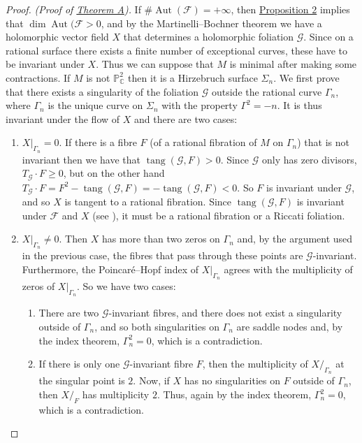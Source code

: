 \documentclass[british]{article}
\providecommand{\tightlist}{%
\setlength{\itemsep}{0pt}\setlength{\parskip}{0pt}}
\begin{document}
\begin{proof}
\emph{(Proof of \hyperref[theorem-A]{Theorem A}).} If
\(\#\operatorname{Aut}({\mathcal{F}})=+\infty\), then
\hyperref[proposition-2]{Proposition 2} implies that
\(\dim\operatorname{Aut}({\mathcal{F}}>0\), and by the
Martinelli--Bochner theorem we have a holomorphic vector field \(X\)
that determines a holomorphic foliation \({\mathcal{G}}\). Since on a
rational surface there exists a finite number of exceptional curves,
these have to be invariant under \(X\). Thus we can suppose that \(M\)
is minimal after making some contractions. If \(M\) is not
\(\mathbb{P}_\mathbb{C}^2\) then it is a Hirzebruch surface
\(\Sigma_n\). We first prove that there exists a singularity of the
foliation \({\mathcal{G}}\) outside the rational curve \(\Gamma_n\),
where \(\Gamma_n\) is the unique curve on \(\Sigma_n\) with the property
\(\Gamma^2=-n\). It is thus invariant under the flow of \(X\) and there
are two cases:

\begin{enumerate}
\def\labelenumi{\arabic{enumi}.}
\item
  \(X|_{\Gamma_n}=0\). If there is a fibre \(F\) (of a rational
  fibration of \(M\) on \(\Gamma_n\)) that is not invariant then we have
  that \(\operatorname{tang}({\mathcal{G}},F)>0\). Since
  \({\mathcal{G}}\) only has zero divisors,
  \(T_{\mathcal{G}}\cdot F\geqslant 0\), but on the other hand
  \(T_{\mathcal{G}}\cdot F=F^2-\operatorname{tang}({\mathcal{G}},F)=-\operatorname{tang}({\mathcal{G}},F)<0\).
  So \(F\) is invariant under \({\mathcal{G}}\), and so \(X\) is tangent
  to a rational fibration. Since
  \(\operatorname{tang}({\mathcal{G}},F)\) is invariant under
  \({\mathcal{F}}\) and \(X\) (see \autocite{6}), it must be a rational
  fibration or a Riccati foliation.
\item
  \(X|_{\Gamma_n}\neq0\). Then \(X\) has more than two zeros on
  \(\Gamma_n\) and, by the argument used in the previous case, the
  fibres that pass through these points are \({\mathcal{G}}\)-invariant.
  Furthermore, the Poincaré--Hopf index of \(X|_{\Gamma_n}\) agrees with
  the multiplicity of zeros of \(X|_{\Gamma_n}\). So we have two cases:

  \begin{enumerate}
  \def\labelenumii{\alph{enumii}.}
  \tightlist
  \item
    There are two \({\mathcal{G}}\)-invariant fibres, and there does not
    exist a singularity outside of \(\Gamma_n\), and so both
    singularities on \(\Gamma_n\) are saddle nodes and, by the index
    theorem, \(\Gamma_n^2=0\), which is a contradiction.
  \item
    If there is only one \({\mathcal{G}}\)-invariant fibre \(F\), then
    the multiplicity of \(X/_{\Gamma_n}\) at the singular point is
    \(2\). Now, if \(X\) has no singularities on \(F\) outside of
    \(\Gamma_n\), then \(X/_F\) has multiplicity \(2\). Thus, again by
    the index theorem, \(\Gamma_n^2=0\), which is a contradiction.
  \end{enumerate}
\end{enumerate}


\end{proof}
\end{document}
